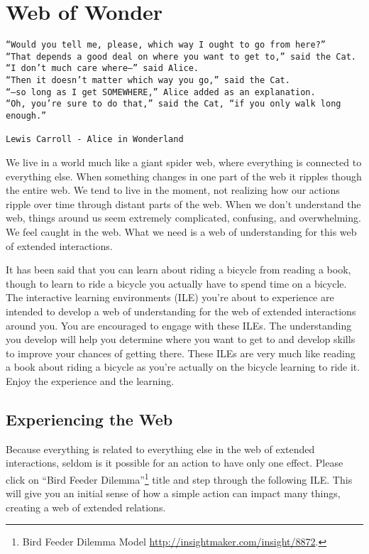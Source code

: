 \documentclass[]{memoir}
\begin{document}
\chapter{Web of Wonder}

\begin{lstlisting}
“Would you tell me, please, which way I ought to go from here?”
“That depends a good deal on where you want to get to,” said the Cat.
“I don’t much care where–” said Alice.
“Then it doesn’t matter which way you go,” said the Cat.
“–so long as I get SOMEWHERE,” Alice added as an explanation.
“Oh, you’re sure to do that,” said the Cat, “if you only walk long enough.”

Lewis Carroll - Alice in Wonderland
\end{lstlisting}

We live in a world much like a giant spider web, where everything is
connected to everything else. When something changes in one part of the
web it ripples though the entire web. We tend to live in the moment, not
realizing how our actions ripple over time through distant parts of the
web. When we don't understand the web, things around us seem extremely
complicated, confusing, and overwhelming. We feel caught in the web.
What we need is a web of understanding for this web of extended
interactions.

It has been said that you can learn about riding a bicycle from reading
a book, though to learn to ride a bicycle you actually have to spend
time on a bicycle. The interactive learning environments (ILE) you're
about to experience are intended to develop a web of understanding for
the web of extended interactions around you. You are encouraged to
engage with these ILEs. The understanding you develop will help you
determine where you want to get to and develop skills to improve your
chances of getting there. These ILEs are very much like reading a book
about riding a bicycle as you're actually on the bicycle learning to
ride it. Enjoy the experience and the learning.

\section{Experiencing the Web}

Because everything is related to everything else in the web of extended
interactions, seldom is it possible for an action to have only one
effect. Please click on ``Bird Feeder Dilemma''\footnote{Bird Feeder
  Dilemma Model \url{http://insightmaker.com/insight/8872}.} title and
step through the following ILE. This will give you an initial sense of
how a simple action can impact many things, creating a web of extended
relations.
\end{document}
